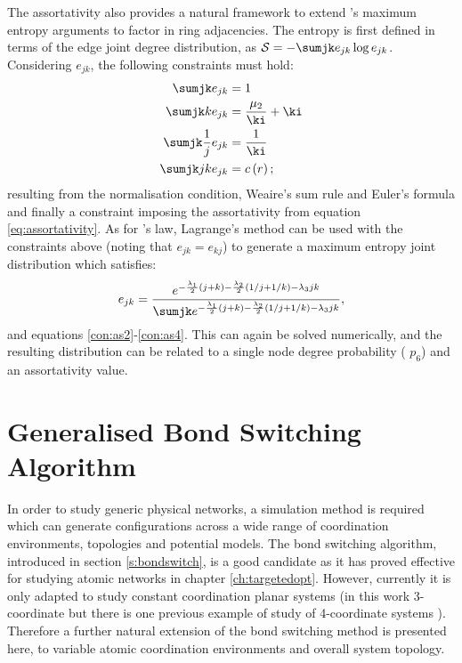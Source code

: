 The assortativity also provides a natural framework to extend \lm's maximum entropy arguments to factor in ring adjacencies.
The entropy is first defined in terms of the edge joint degree distribution, as $\mathcal{S}=-\sumjk e_{jk}\log e_{jk}$.
Considering $e_{jk}$, the following constraints must hold:
\begin{align}
        \sumjk e_{jk} &=1 \label{con:as1}\\
        \sumjk ke_{jk} &= \frac{\mu_2}{\ki}+\ki \label{con:as2}\\
        \sumjk \frac{1}{j}e_{jk} &= \frac{1}{\ki} \label{con:as3}\\
        \sumjk jke_{jk} &= c\left(r\right)\label{con:as4};
\end{align}
resulting from the normalisation condition, Weaire's sum rule \cite{Weaire1974} and Euler's formula and finally a constraint imposing the assortativity from equation \eqref{eq:assortativity}.
As for \lm's law, Lagrange's method can be used with the constraints above (noting that $e_{jk}=e_{kj}$) to generate a maximum entropy joint distribution which satisfies:
\begin{equation}
        \label{eq:mer}
        e_{jk} = \frac{e^{-\frac{\lambda_1}{2}\left(j+k\right)-\frac{\lambda_2}{2}\left(1/j+1/k\right)-\lambda_3 jk}}{\sumjk e^{-\frac{\lambda_1}{2}\left(j+k\right)-\frac{\lambda_2}{2}\left(1/j+1/k\right)-\lambda_3 jk}},
\end{equation}
and equations \eqref{con:as2}\--\eqref{con:as4}.
This can again be solved numerically, and the resulting distribution can be related to a single node degree probability (\eg{} $p_6$) and an assortativity value.

\section{Generalised Bond Switching Algorithm}
\label{s:genbondswitching}

In order to study generic physical networks, a simulation method is required which can generate configurations across a wide range of coordination environments, topologies and potential models. 
The bond switching algorithm, introduced in section \ref{s:bondswitch}, is a good candidate as it has proved effective for studying atomic networks in chapter \ref{ch:targetedopt}.
However, currently it is only adapted to study constant coordination planar systems (in this work 3\--coordinate but there is one previous example of study of 4\--coordinate systems \cite{Greneche1990}).
Therefore a further natural extension of the bond switching method is presented here, to variable atomic coordination environments and overall system topology.

